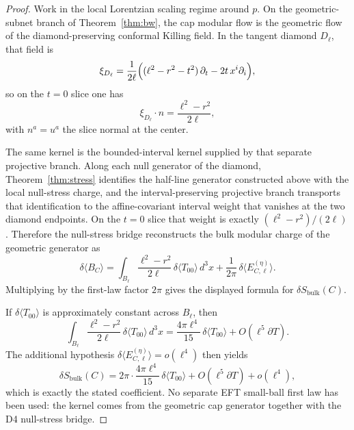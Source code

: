 \documentclass[11pt]{article}
\begin{document}
\begin{proof}
Work in the local Lorentzian scaling regime around $p$. On the geometric-subnet branch of Theorem~\ref{thm:bw}, the cap modular flow is the geometric flow of the diamond-preserving conformal Killing field. In the tangent diamond $D_\ell$, that field is
\[
\xi_{D_\ell}
=
\frac{1}{2\ell}
\Bigl((\ell^2-r^2-t^2)\,\partial_t-2t\,x^i\partial_i\Bigr),
\]
so on the $t=0$ slice one has
\[
\xi_{D_\ell}\!\cdot n=\frac{\ell^2-r^2}{2\ell},
\]
with $n^a=u^a$ the slice normal at the center.

The same kernel is the bounded-interval kernel supplied by that separate projective branch. Along each null generator of the diamond, Theorem~\ref{thm:stress} identifies the half-line generator constructed above with the local null-stress charge, and the interval-preserving projective branch transports that identification to the affine-covariant interval weight that vanishes at the two diamond endpoints. On the $t=0$ slice that weight is exactly $(\ell^2-r^2)/(2\ell)$. Therefore the null-stress bridge reconstructs the bulk modular charge of the geometric generator as
\[
\delta\langle B_C\rangle
=
\int_{B_\ell}\frac{\ell^2-r^2}{2\ell}\,\delta\langle T_{00}\rangle\,d^3x
+\frac{1}{2\pi}\,\delta\langle E^{(\eta)}_{C,\ell}\rangle.
\]
Multiplying by the first-law factor $2\pi$ gives the displayed formula for $\delta S_{\mathrm{bulk}}(C)$.

If $\delta\langle T_{00}\rangle$ is approximately constant across $B_\ell$, then
\[
\int_{B_\ell}\frac{\ell^2-r^2}{2\ell}\,\delta\langle T_{00}\rangle\,d^3x
=
\frac{4\pi\ell^4}{15}\,\delta\langle T_{00}\rangle
+O(\ell^5\partial T).
\]
\noindent
The additional hypothesis $\delta\langle E^{(\eta)}_{C,\ell}\rangle=o(\ell^4)$ then yields
\[
\delta S_{\mathrm{bulk}}(C)
=
2\pi\cdot\frac{4\pi\ell^4}{15}\,\delta\langle T_{00}\rangle
+O(\ell^5\partial T)+o(\ell^4),
\]
which is exactly the stated coefficient. No separate EFT small-ball first law has been used: the kernel comes from the geometric cap generator together with the D4 null-stress bridge.
\end{proof}
\end{document}
